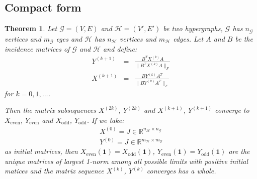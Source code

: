 \documentclass[a4paper,11pt]{report}
\newtheorem{theorem}{Theorem}[section]
\newcommand{\R}{{\mathbb R}}
\newcommand{\graf}{\mathscr{G}}
\newcommand{\grafeen}{\mathscr{H}}
\newcommand{\hgraf}{\mathcal{G}}
\newcommand{\hgrafeen}{\mathcal{H}}
\begin{document}
\subsection{Compact form}
 \begin{theorem}\label{incidencegrootbewijs}
   Let $\hgraf=(V,E)$ and $\hgrafeen=(V',E')$ be two hypergraphs, $\hgraf$ has $n_\hgraf$ 
   vertices and $m_\hgraf$ eges and $\hgrafeen$ has $n_\hgrafeen$ vertices and $m_\hgrafeen$ 
   edges. Let $A$ and $B$ be the incidence matrices of $\hgraf$ and $\hgrafeen$ 
   and define:
 \begin{eqnarray}
  Y^{(k+1)} &=& \frac{B^TX^{(k)}A}{\|B^TX^{(k)}A\|_F}\label{edgehypform}\\
   X^{(k+1)} &=& \frac{BY^{(k)}A^T}{\|BY^{(k)}A^T\|_F}\label{nodehypform}
 \end{eqnarray}
  for  $k =  0,1,\ldots$.
  
  Then the matrix subsequences $X^{(2k)}$, $Y^{(2k)}$ and $X^{(k+1)}$, $Y^{(k+1)}$ 
  converge to $X_{\text{even}}$, $Y_{\text{even}}$ and $X_{\text{odd}}$, 
  $Y_{\text{odd}}$. If we take:
  \begin{eqnarray*}  X^{(0)} = J \in \R^{n_\grafeen \times n_\graf}\\
    Y^{(0)} = J \in \R^{m_\grafeen \times m_\graf}
  \end{eqnarray*}
 as initial matrices, then $X_{\text{even}}(\mathbf{1})=X_{\text{odd}}(\mathbf{1})$, $Y_{\text{even}}(\mathbf{1})= Y_{\text{odd}}(\mathbf{1})$ 
 are the unique matrices of largest 1-norm among all possible limits with positive 
 initial matices and the matrix sequence $X^{(k)}$, $Y^{(k)}$ converges has a 
 whole.
  \end{theorem}
\end{document}
